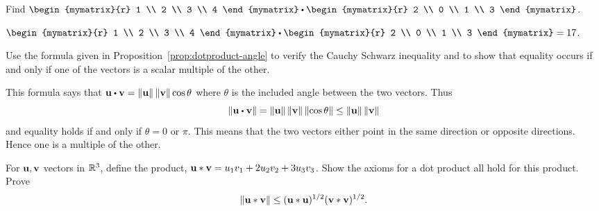 
\begin{ex} Find $\begin{mymatrix}{r}
1 \\
2 \\
3 \\
4
\end{mymatrix} \dotprod \begin{mymatrix}{r}
2 \\
0 \\
1 \\
3
\end{mymatrix}$.
\begin{sol}
$\begin{mymatrix}{r}
1 \\
2 \\
3 \\
4
\end{mymatrix} \dotprod \begin{mymatrix}{r}
2 \\
0 \\
1 \\
3
\end{mymatrix} = 17$.
\end{sol}
\end{ex}

\begin{ex} Use the formula given in Proposition~\ref{prop:dotproduct-angle} to verify the Cauchy Schwarz inequality and
to show that equality occurs if and only if one of the vectors is a scalar
multiple of the other.
\begin{sol}
This formula says that $\vect{u}\dotprod \vect{v}=\norm{
\vect{u}} \norm{\vect{v}} \cos \theta $ where $
\theta $ is the included angle between the two vectors. Thus
\begin{equation*}
\norm{\vect{u}\dotprod \vect{v}} =\norm{\vect{u}}
\norm{\vect{v}} \norm{\cos \theta} \leq
\norm{\vect{u}} \norm{\vect{v}}
\end{equation*}
and equality holds if and only if $\theta =0$ or $\pi$. This means that the
two vectors either point in the same direction or opposite directions. Hence
one is a multiple of the other.
\end{sol}
\end{ex}

\begin{ex} For $\mbox{\bf u},\mbox{\bf v}$ vectors in $\mathbb{R}^{3}$, define the product,
$\mbox{\bf u}\ast \mbox{\bf v} =  u_{1}v_{1}+2u_{2}v_{2}+3u_{3}v_{3}$. Show the axioms
for a dot product all hold for this product. Prove
\begin{equation*}
\left\|\mbox{\bf u}\ast \mbox{\bf v}\right\| \leq (\mbox{\bf u}\ast \mbox{\bf u})
^{1/2}(\mbox{\bf v}\ast \mbox{\bf v}) ^{1/2}.
\end{equation*}
\end{ex}


